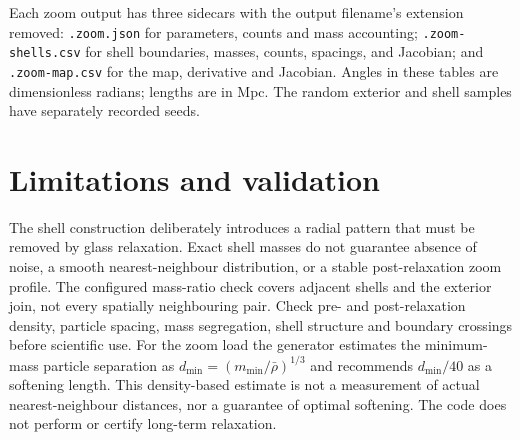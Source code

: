 \documentclass[11pt]{article}
\begin{document}
Each zoom output has three sidecars with the output filename's extension
removed: \texttt{.zoom.json} for parameters, counts and mass accounting;
\texttt{.zoom-shells.csv} for shell boundaries, masses, counts, spacings,
and Jacobian; and \texttt{.zoom-map.csv} for the map,
derivative and Jacobian. Angles in these tables are dimensionless radians;
lengths are in Mpc. The random exterior and shell samples have separately
recorded seeds.

\section{Limitations and validation}
The shell construction deliberately introduces a radial pattern that must be
removed by glass relaxation. Exact shell masses do not guarantee absence of
noise, a smooth nearest-neighbour distribution, or a stable post-relaxation
zoom profile. The configured mass-ratio check covers adjacent shells and the
exterior join, not every spatially neighbouring pair. Check pre- and
post-relaxation density, particle spacing, mass segregation, shell structure
and boundary crossings before scientific use. For the zoom load the generator
estimates the minimum-mass particle separation as
\(d_{\min}=(m_{\min}/\bar\rho)^{1/3}\) and recommends \(d_{\min}/40\) as a
softening length. This density-based estimate is not a measurement of actual
nearest-neighbour distances, nor a guarantee of optimal softening. The code
does not perform or certify long-term relaxation.
\end{document}
